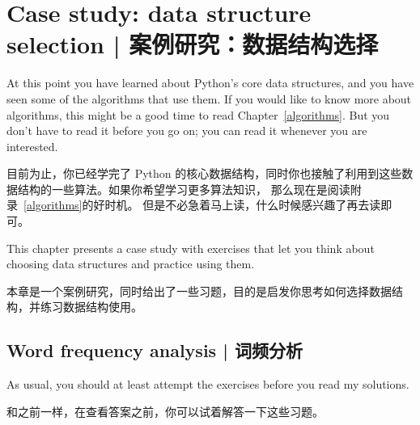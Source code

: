 

\chapter{Case study: data structure selection  |  案例研究：数据结构选择}

At this point you have learned about Python's core data structures,
and you have seen some of the algorithms that use them.
If you would like to know more about algorithms, this might be a good
time to read Chapter~\ref{algorithms}.
But you don't have to read it before you go on; you can read
it whenever you are interested.

目前为止，你已经学完了 Python 的核心数据结构，同时你也接触了利用到这些数据结构的一些算法。如果你希望学习更多算法知识，  那么现在是阅读附录~\ref{algorithms}的好时机。  但是不必急着马上读，什么时候感兴趣了再去读即可。

This chapter presents a case study with exercises that let
you think about choosing data structures and practice using them.

本章是一个案例研究，同时给出了一些习题，目的是启发你思考如何选择数据结构，并练习数据结构使用。

\section{Word frequency analysis  |  词频分析}
\label{analysis}

As usual, you should at least attempt the exercises
before you read my solutions.

和之前一样，在查看答案之前，你可以试着解答一下这些习题。

